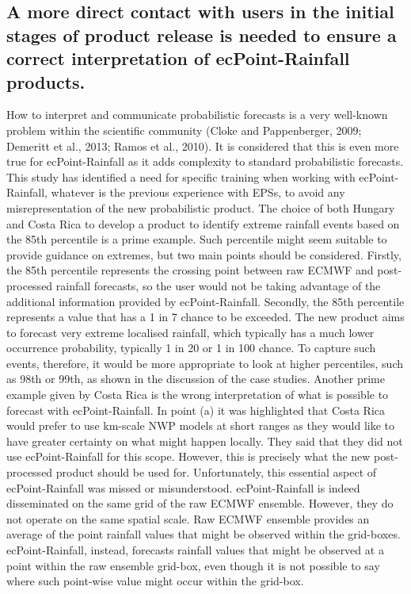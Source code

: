 \documentclass[twocol]{ametsocV5} %
\begin{document}
\subsection{A more direct contact with users in the initial stages of product release is needed to ensure a correct interpretation of ecPoint-Rainfall products.}
    How to interpret and communicate probabilistic forecasts is a very well-known problem within the scientific community  (Cloke and Pappenberger, 2009; Demeritt et al., 2013; Ramos et al., 2010). It is considered that this is even more true for ecPoint-Rainfall as it adds complexity to standard probabilistic forecasts. This study has identified a need for specific training when working with ecPoint-Rainfall, whatever is the previous experience with EPSs, to avoid any misrepresentation of the new probabilistic product. The choice of both Hungary and Costa Rica to develop a product to identify extreme rainfall events based on the 85th percentile is a prime example. Such percentile might seem suitable to provide guidance on extremes, but two main points should be considered. Firstly, the 85th percentile represents the crossing point between raw ECMWF and post-processed rainfall forecasts, so the user would not be taking advantage of the additional information provided by ecPoint-Rainfall. Secondly, the 85th percentile represents a value that has a 1 in 7 chance to be exceeded. The new product aims to forecast very extreme localised rainfall, which typically has a much lower occurrence probability, typically 1 in 20 or 1 in 100 chance. To capture such events, therefore, it would be more appropriate to look at higher percentiles, such as 98th or 99th, as shown in the discussion of the case studies.  Another prime example given by Costa Rica is the wrong interpretation of what is possible to forecast with ecPoint-Rainfall. In point (a) it was highlighted that Costa Rica would prefer to use km-scale NWP models at short ranges as they would like to have greater certainty on what might happen locally. They said that they did not use ecPoint-Rainfall for this scope. However, this is precisely what the new post-processed product should be used for. Unfortunately, this essential aspect of ecPoint-Rainfall was missed or misunderstood. ecPoint-Rainfall is indeed disseminated on the same grid of the raw ECMWF ensemble. However, they do not operate on the same spatial scale. Raw ECMWF ensemble provides an average of the point rainfall values that might be observed within the grid-boxes. ecPoint-Rainfall, instead, forecasts rainfall values that might be observed at a point within the raw ensemble grid-box, even though it is not possible to say where such point-wise value might occur within the grid-box. 
\end{document}
